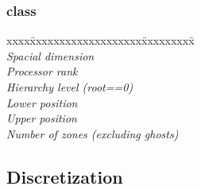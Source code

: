 \documentclass[11pt]{article}
\begin{document}
\subsubsection{ class}

\begin{tabbing}
xxxx\=xxxxxxxxxxxxxxxxxxx\=xxxxxxxxx\=\kill\\ 
\>   \>    \> \textit{Spacial dimension} \\
\>   \>    \> \textit{Processor rank} \\
\>   \>    \> \textit{Hierarchy level (root==0)} \\
\>   \>   \> \textit{Lower position} \\
\>   \>   \> \textit{Upper position} \\
\>   \>    \> \textit{Number of zones (excluding ghosts)} \\
\end{tabbing}

\subsection{Discretization} \label{s:discretization}

\newcommand{\indvar}{r}
 \newcommand{\uc}{u(\indvar)}

 \newcommand{\uxp}{u(\indvar+h_x)}
 \newcommand{\uxm}{u(\indvar-h_x)}
 \newcommand{\uxph}{u(\indvar+\frac{h_x}{2})}
 \newcommand{\uxmh}{u(\indvar-\frac{h_x}{2})}

 \newcommand{\uyp}{u(\indvar+h_y)}
 \newcommand{\uym}{u(\indvar-h_y)}
 \newcommand{\uyph}{u(\indvar+\frac{h_y}{2})}
 \newcommand{\uymh}{u(\indvar-\frac{h_y}{2})}

 \newcommand{\uzp}{u(\indvar+h_z)}
 \newcommand{\uzm}{u(\indvar-h_z)}
 \newcommand{\uzph}{u(\indvar+\frac{h_z}{2})}
 \newcommand{\uzmh}{u(\indvar-\frac{h_z}{2})}

 \newcommand{\ac}{a(\indvar)}
 \newcommand{\axph}{a(\indvar+\frac{h_x}{2})}
 \newcommand{\axmh}{a(\indvar-\frac{h_x}{2})}
 \newcommand{\ayph}{a(\indvar+\frac{h_y}{2})}
 \newcommand{\aymh}{a(\indvar-\frac{h_y}{2})}
 \newcommand{\azph}{a(\indvar+\frac{h_z}{2})}
 \newcommand{\azmh}{a(\indvar-\frac{h_z}{2})}
\end{document}
